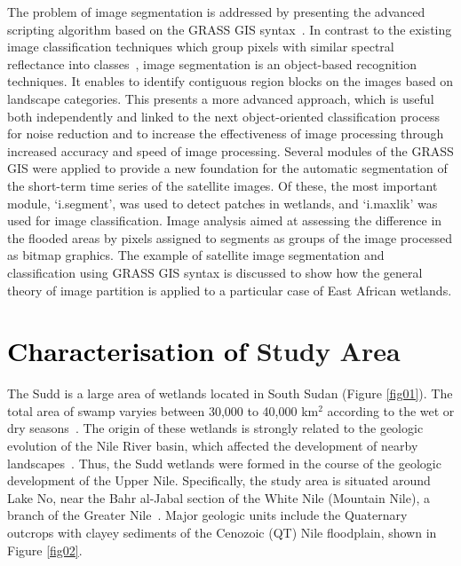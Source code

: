\documentclass[analytics,article,accept,pdftex,moreauthors]{Definitions/mdpi}
\begin{document}
The problem of image segmentation is addressed by presenting the advanced scripting algorithm based on the GRASS GIS syntax~\cite{Lemenkova202125,jmse11040871,HOFIERKA2009387,technologies11020046}. In contrast to the existing image classification techniques which group pixels with similar spectral reflectance into classes~\cite{DIVITTORIO20181,info14040249,Campos,Lemenkova202229}, image segmentation is an object-based recognition techniques. It enables to identify contiguous region blocks on the images based on landscape categories. This presents a more advanced approach, which is useful both independently and linked to the next object-oriented classification process for noise reduction and to increase the  effectiveness of image processing through  increased accuracy and speed of image processing. Several modules of the GRASS GIS were applied to provide a new foundation for the automatic segmentation of the short-term time series of the satellite images. Of these, the most important module, `i.segment', was used to detect patches in wetlands, and `i.maxlik' was used for image classification. Image analysis aimed at assessing the difference in the flooded areas by pixels assigned to segments as groups of the image processed as bitmap graphics. The example of satellite image segmentation and classification using GRASS GIS syntax is discussed to show how the general theory of image partition is applied to a particular case of East African wetlands.

\section{\textcolor{black}{Characterisation of} Study Area}

The Sudd is a large area of wetlands located in South Sudan (Figure \ref{fig01}). The total area of swamp varyies between 30,000 to 40,000 km$^2$ according to the wet or dry seasons~\cite{MohamedSavenije}. The origin of these wetlands is strongly related to the geologic evolution of the Nile River basin, which affected the development of nearby landscapes~\cite{Adamson}. Thus, the Sudd wetlands were formed in the course of the geologic development of the Upper Nile. %
Specifically, the study area is situated around  Lake No, near the Bahr al-Jabal section of the White Nile (Mountain Nile), a branch of the Greater Nile~\cite{Broun}. Major geologic units include the Quaternary outcrops with clayey sediments of the Cenozoic (QT) Nile floodplain, shown in Figure \ref{fig02}.  %
\end{document}
